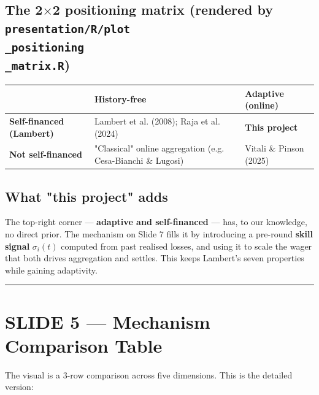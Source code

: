 \documentclass[11pt]{article}
\begin{document}
\subsection{The 2$\times$2 positioning matrix (rendered by \texttt{presentation/R/plot\\_positioning\\_matrix.R})}


\begin{center}
\begin{tabular}{lll}
\toprule
 & \textbf{History-free} & \textbf{Adaptive (online)} \\
\midrule
\textbf{Self-financed (Lambert)} & Lambert et al. (2008); Raja et al. (2024) & \textbf{This project} \\
\textbf{Not self-financed} & "Classical" online aggregation (e.g. Cesa-Bianchi \& Lugosi) & Vitali \& Pinson (2025) \\
\bottomrule
\end{tabular}
\end{center}

\subsection{What "this project" adds}


The top-right corner --- \textbf{adaptive and self-financed} --- has, to our knowledge, no direct prior. The mechanism on Slide 7 fills it by introducing a pre-round \textbf{skill signal} $\sigma_i(t)$ computed from past realised losses, and using it to scale the wager that both drives aggregation and settles. This keeps Lambert's seven properties while gaining adaptivity.

\bigskip\hrule\bigskip

\section{SLIDE 5 --- Mechanism Comparison Table}


The visual is a 3-row comparison across five dimensions. This is the detailed version:
\end{document}
